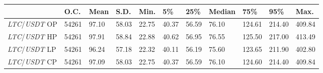 \begin{tabular}{lllllllllll}
\toprule
 & \textbf{O.C.} & \textbf{Mean} & \textbf{S.D.} & \textbf{Min.} & \textbf{5\%} & \textbf{25\%} & \textbf{Median} & \textbf{75\%} & \textbf{95\%} & \textbf{Max.} \\
\midrule
\emph{LTC}/\emph{USDT} OP & 54261 & 97.10 & 58.03 & 22.75 & 40.37 & 56.59 & 76.10 & 124.61 & 214.40 & 409.84 \\
\emph{LTC}/\emph{USDT} HP & 54261 & 97.91 & 58.84 & 22.88 & 40.62 & 56.95 & 76.55 & 125.50 & 217.00 & 413.49 \\
\emph{LTC}/\emph{USDT} LP & 54261 & 96.24 & 57.18 & 22.32 & 40.11 & 56.19 & 75.60 & 123.65 & 211.90 & 402.80 \\
\emph{LTC}/\emph{USDT} CP & 54261 & 97.09 & 58.03 & 22.75 & 40.37 & 56.59 & 76.10 & 124.60 & 214.40 & 409.84 \\
\bottomrule
\end{tabular}
